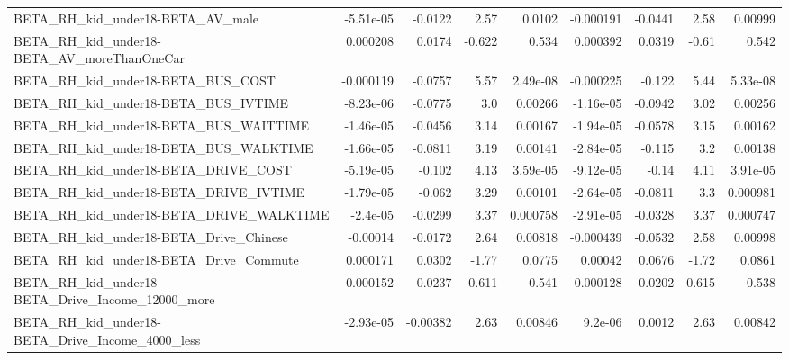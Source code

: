 \begin{tabular}{lrrrrrrrr}
BETA\_RH\_kid\_under18-BETA\_AV\_male                   &   -5.51e-05 &      -0.0122 &      2.57 &   0.0102 &  -0.000191 &     -0.0441 &         2.58 &       0.00999 \\
BETA\_RH\_kid\_under18-BETA\_AV\_moreThanOneCar         &    0.000208 &       0.0174 &    -0.622 &    0.534 &   0.000392 &      0.0319 &        -0.61 &         0.542 \\
BETA\_RH\_kid\_under18-BETA\_BUS\_COST                  &   -0.000119 &      -0.0757 &      5.57 & 2.49e-08 &  -0.000225 &      -0.122 &         5.44 &      5.33e-08 \\
BETA\_RH\_kid\_under18-BETA\_BUS\_IVTIME                &   -8.23e-06 &      -0.0775 &       3.0 &  0.00266 &  -1.16e-05 &     -0.0942 &         3.02 &       0.00256 \\
BETA\_RH\_kid\_under18-BETA\_BUS\_WAITTIME              &   -1.46e-05 &      -0.0456 &      3.14 &  0.00167 &  -1.94e-05 &     -0.0578 &         3.15 &       0.00162 \\
BETA\_RH\_kid\_under18-BETA\_BUS\_WALKTIME              &   -1.66e-05 &      -0.0811 &      3.19 &  0.00141 &  -2.84e-05 &      -0.115 &          3.2 &       0.00138 \\
BETA\_RH\_kid\_under18-BETA\_DRIVE\_COST                &   -5.19e-05 &       -0.102 &      4.13 & 3.59e-05 &  -9.12e-05 &       -0.14 &         4.11 &      3.91e-05 \\
BETA\_RH\_kid\_under18-BETA\_DRIVE\_IVTIME              &   -1.79e-05 &       -0.062 &      3.29 &  0.00101 &  -2.64e-05 &     -0.0811 &          3.3 &      0.000981 \\
BETA\_RH\_kid\_under18-BETA\_DRIVE\_WALKTIME            &    -2.4e-05 &      -0.0299 &      3.37 & 0.000758 &  -2.91e-05 &     -0.0328 &         3.37 &      0.000747 \\
BETA\_RH\_kid\_under18-BETA\_Drive\_Chinese             &    -0.00014 &      -0.0172 &      2.64 &  0.00818 &  -0.000439 &     -0.0532 &         2.58 &       0.00998 \\
BETA\_RH\_kid\_under18-BETA\_Drive\_Commute             &    0.000171 &       0.0302 &     -1.77 &   0.0775 &    0.00042 &      0.0676 &        -1.72 &        0.0861 \\
BETA\_RH\_kid\_under18-BETA\_Drive\_Income\_12000\_more   &    0.000152 &       0.0237 &     0.611 &    0.541 &   0.000128 &      0.0202 &        0.615 &         0.538 \\
BETA\_RH\_kid\_under18-BETA\_Drive\_Income\_4000\_less    &   -2.93e-05 &     -0.00382 &      2.63 &  0.00846 &    9.2e-06 &      0.0012 &         2.63 &       0.00842 \\

\end{tabular}
